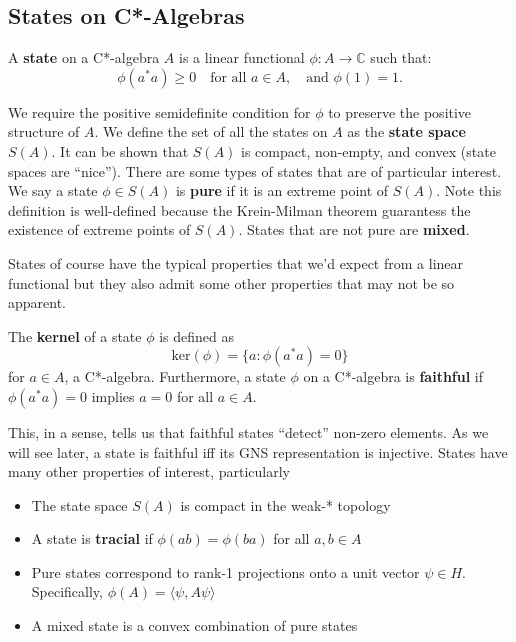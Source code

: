 \subsection{States on C*-Algebras}
\begin{definition}
A \textbf{state} on a C*-algebra \( A \) is a linear functional \( \phi: A \to \mathbb{C} \) such that:
\[
\phi(a^*a) \geq 0 \quad \text{for all } a \in A, \quad \text{and } \phi(1) = 1.
\]
\end{definition}


We require the positive semidefinite condition for $\phi$ to preserve the positive structure
of $A$. We define the set of all the states on $A$ as the \textbf{state space} $S(A)$. It
can be shown that $S(A)$ is compact, non-empty, and convex (state spaces are ``nice'').
There are some types of states that are of particular interest. 
We say a state $\phi \in S(A)$ is \textbf{pure} if it is an extreme point of $S(A)$.
Note this definition is well-defined because the Krein-Milman theorem guarantess
the existence of extreme points of $S(A)$. States that are not pure are \textbf{mixed}.

\par

States of course have the typical properties that we'd expect from a linear functional
but they also admit some other properties that may not be so apparent. 

\begin{definition}
    The \textbf{kernel} of a state $\phi$ is defined as
    \begin{equation*}
        \text{ker}(\phi) = \{a : \phi(a^*a) = 0 \}
    \end{equation*}
    for $a \in A$, a C*-algebra. Furthermore, a state $\phi$ on a C*-algebra
    is \textbf{faithful} if $\phi(a^*a) = 0$ implies $a=0$ for all $a \in A$.
\end{definition}

This, in a sense, tells us that faithful states ``detect'' non-zero elements. As we will see
later, a state is faithful iff its GNS representation is injective. States have many other properties of interest, particularly
\begin{itemize}
    \item The state space $S(A)$ is compact in the weak-* topology
    \item A state is \textbf{tracial} if $\phi(ab) = \phi(ba)$ for all $a,b \in A$
    \item Pure states correspond to rank-1 projections onto a unit vector $\psi \in H$.
    Specifically, $\phi(A) = \langle \psi, A\psi \rangle$
    \item A mixed state is a convex combination of pure states
\end{itemize}